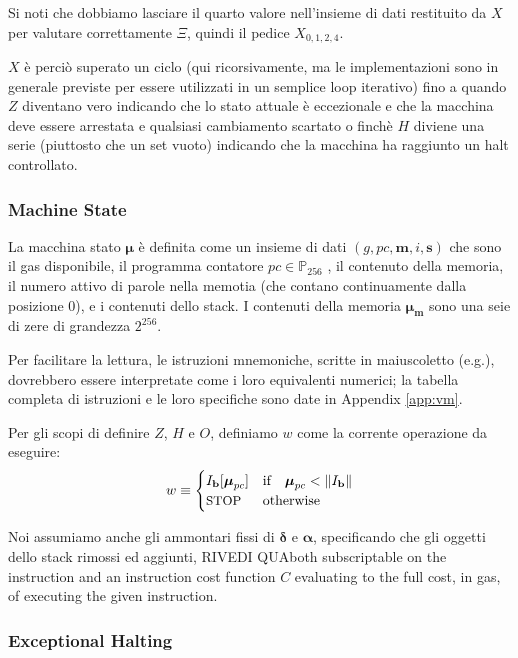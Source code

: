 \documentclass[9pt,oneside]{amsart}
\makeatletter
\newcommand*\eg{e.g.\@\xspace}
\makeatother
\begin{document}
\begin{multicols}{2}
Si noti che dobbiamo lasciare il quarto valore nell'insieme di dati restituito da $X$ per valutare correttamente $\Xi$, quindi il pedice $X_{0,1,2,4}$.

$X$ è perciò superato un ciclo (qui ricorsivamente, ma le implementazioni sono in generale previste per essere utilizzati in un semplice loop iterativo) fino a quando $Z$ diventano vero indicando che lo stato attuale è eccezionale e che la macchina deve essere arrestata e qualsiasi cambiamento scartato o finchè $H$ diviene una serie (piuttosto che un set vuoto) indicando che la macchina ha raggiunto un halt controllato.

\subsubsection{Machine State}
La macchina stato $\boldsymbol{\mu}$ è definita come un insieme di dati $(g, pc, \mathbf{m}, i, \mathbf{s})$ che sono il gas disponibile, il programma contatore $pc \in \mathbb{P}_{256}$ , il contenuto della memoria, il numero attivo di parole nella memotia (che contano continuamente dalla posizione 0), e i contenuti dello stack. I contenuti della memoria $\boldsymbol{\mu}_\mathbf{m}$ sono una seie di zere di grandezza $2^{256}$.

Per facilitare la lettura, le istruzioni mnemoniche, scritte in maiuscoletto (\eg {}), dovrebbero essere interpretate come i loro equivalenti numerici; la tabella completa di istruzioni e le loro specifiche sono date in Appendix \ref{app:vm}.

Per gli scopi di definire $Z$, $H$ e $O$, definiamo $w$ come la corrente operazione da eseguire:
\begin{equation}\label{eq:currentoperation}
w \equiv \begin{cases} I_\mathbf{b}[\boldsymbol{\mu}_{pc}] & \text{if} \quad \boldsymbol{\mu}_{pc} < \lVert I_\mathbf{b} \rVert \\
\text{\small STOP} & \text{otherwise}
\end{cases}
\end{equation}

Noi assumiamo anche gli ammontari fissi di $\mathbf{\delta}$ e $\mathbf{\alpha}$, specificando che gli oggetti dello stack rimossi ed aggiunti, RIVEDI QUAboth subscriptable on the instruction and an instruction cost function $C$ evaluating to the full cost, in gas, of executing the given instruction.

\subsubsection{Exceptional Halting}


\end{multicols}
\end{document}
